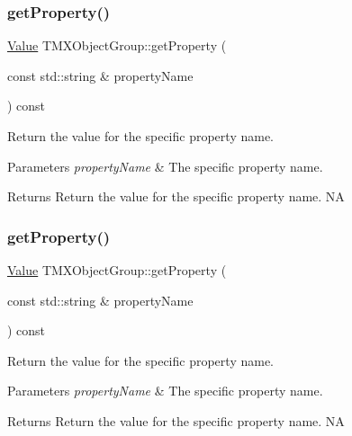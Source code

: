 \subsubsection{\texorpdfstring{get\+Property()}{getProperty()}\hspace{0.1cm}{\footnotesize\ttfamily [1/2]}}
{\footnotesize\ttfamily \hyperlink{classValue}{Value} T\+M\+X\+Object\+Group\+::get\+Property (\begin{DoxyParamCaption}\item[{const std\+::string \&}]{property\+Name }\end{DoxyParamCaption}) const}

Return the value for the specific property name.


\begin{DoxyParams}{Parameters}
{\em property\+Name} & The specific property name. \\
\hline
\end{DoxyParams}
\begin{DoxyReturn}{Returns}
Return the value for the specific property name.  NA 
\end{DoxyReturn}
\mbox{\label{classTMXObjectGroup_a8cf30e4dc195b522f044efa6af6b2690}} 
\subsubsection{\texorpdfstring{get\+Property()}{getProperty()}\hspace{0.1cm}{\footnotesize\ttfamily [2/2]}}
{\footnotesize\ttfamily \hyperlink{classValue}{Value} T\+M\+X\+Object\+Group\+::get\+Property (\begin{DoxyParamCaption}\item[{const std\+::string \&}]{property\+Name }\end{DoxyParamCaption}) const}

Return the value for the specific property name.


\begin{DoxyParams}{Parameters}
{\em property\+Name} & The specific property name. \\
\hline
\end{DoxyParams}
\begin{DoxyReturn}{Returns}
Return the value for the specific property name.  NA 
\end{DoxyReturn}
\mbox{\label{classTMXObjectGroup_aafffef23335ae841700cfddde5e6301c}} 
